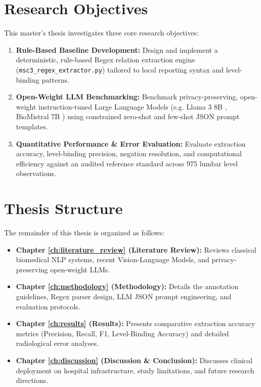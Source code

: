 \section{Research Objectives}
This master's thesis investigates three core research objectives:
\begin{enumerate}
    \item \textbf{Rule-Based Baseline Development:} Design and implement a deterministic, rule-based Regex relation extraction engine (\texttt{msc3\_regex\_extractor.py}) tailored to local reporting syntax and level-binding patterns.
    \item \textbf{Open-Weight LLM Benchmarking:} Benchmark privacy-preserving, open-weight instruction-tuned Large Language Models (e.g. Llama 3 8B \cite{meta2024llama}, BioMistral 7B \cite{labrak2024biomistral}) using constrained zero-shot and few-shot JSON prompt templates.
    \item \textbf{Quantitative Performance \& Error Evaluation:} Evaluate extraction accuracy, level-binding precision, negation resolution, and computational efficiency against an audited reference standard across 975 lumbar level observations.
\end{enumerate}

\section{Thesis Structure}
The remainder of this thesis is organized as follows:
\begin{itemize}
    \item \textbf{Chapter \ref{ch:literature_review} (Literature Review):} Reviews classical biomedical NLP systems, recent Vision-Language Models, and privacy-preserving open-weight LLMs.
    \item \textbf{Chapter \ref{ch:methodology} (Methodology):} Details the annotation guidelines, Regex parser design, LLM JSON prompt engineering, and evaluation protocols.
    \item \textbf{Chapter \ref{ch:results} (Results):} Presents comparative extraction accuracy metrics (Precision, Recall, F1, Level-Binding Accuracy) and detailed radiological error analyses.
    \item \textbf{Chapter \ref{ch:discussion} (Discussion \& Conclusion):} Discusses clinical deployment on hospital infrastructure, study limitations, and future research directions.
\end{itemize}
